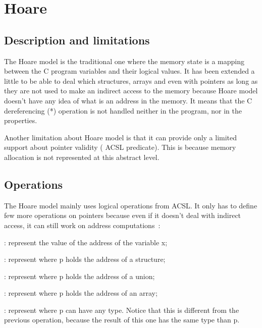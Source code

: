 
\section{Hoare}\label{sec-hoare}

\subsection{Description and limitations}

The Hoare model is the traditional one where
the memory state is a mapping between the C program 
variables and their logical values. 
It has been extended a little to be able to deal which structures, arrays
and even with pointers as long as they are not used to make an indirect 
access to
the memory because Hoare model doesn't have any idea of what is an address
in the memory. It means that the C dereferencing (*) operation is not handled 
neither in the program, nor in the properties.

Another limitation about Hoare model is that it can provide only a limited
support about pointer validity ( ACSL predicate).
This is because memory allocation is not represented at this abstract level.

\subsection{Operations}

The Hoare model mainly uses logical operations from ACSL. 
It only has to define few more
operations on pointers because even if it doesn't deal with indirect access,
it can still work on address computations~:

\begin{description}
  \item {} : represent the value of the address of the
    variable x;
  \item {} : 
    represent  where p
    holds the address of a structure;
  \item {} :  
    represent  where p
    holds the address of a union;
  \item {} : represent 
    where p holds the address of an array;
  \item {} : represent  
    where p
    can have any type. Notice that this is different from the previous
    operation, because the result of this one has the same type than p.
\end{description}

